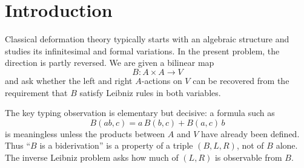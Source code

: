 \documentclass[11pt]{amsart}
\newcommand{\Q}{\mathbb Q}
\begin{document}
\begin{abstract}
Finally, a $v$-degree filtration shows that the stationary $E/K/P$ feedback variables are terminal corrections: they cannot carry information into future distinguished $v^6$ forcing.  The true memory is an autonomous low-rail subsystem $x_b(k)=F_{k+b}^{(k,b)}$, $b=2,3,4,5$, satisfying exact triangular quadratic recursions.  A frozen order-$14$ transfer law passes two genuine out-of-sample tests at arities $22$ and $23$.  More importantly, the homogeneous operator $A=-h\,\mathrm{ad}_\alpha$ and the triangular Cauchy forcing admit an all-orders spectral analysis.  With
\[
E=S+2,
\qquad
q(S)=S^5-4S^4+12S^3-32S^2+80S-192,
\]
the stabilized homogeneous module has minimal polynomial $m_A=Eq$, while the low rails have
\[
p_3=E^2q,
\qquad
p_4=E^3q,
\qquad
p_5=E^4q^2.
\]
Residual modules, finite landing operators, and gcd formulas then give a complete spectral stratification of the $x_5$ extension.  The homogeneous landing, forcing-memory, and canonical higher-lift layers are classified respectively by $\gcd(m_A,r_d)$, $\gcd(p_4,r_d)$, and $\gcd(p_5,r_d)$.  Over a splitting field the finest canonical stratification has $708$ nonzero strata plus the zero datum; over $\Q$ it collapses to eight nonzero strata plus zero.  Gauge quotients, general triangular spectral-extension theorems beyond the fixed cubic contraction, and definitive literature positioning remain open.
\end{abstract}

\maketitle
\tableofcontents

\section{Introduction}

Classical deformation theory typically starts with an algebraic structure and studies its infinitesimal and formal variations.  In the present problem, the direction is partly reversed.  We are given a bilinear map
\[
B:A\times A\longrightarrow V
\]
and ask whether the left and right $A$-actions on $V$ can be recovered from the requirement that $B$ satisfy Leibniz rules in both variables.

The key typing observation is elementary but decisive: a formula such as
\[
B(ab,c)=a\,B(b,c)+B(a,c)\,b
\]
is meaningless unless the products between $A$ and $V$ have already been defined.  Thus ``$B$ is a biderivation'' is a property of a triple $(B,L,R)$, not of $B$ alone.  The inverse Leibniz problem asks how much of $(L,R)$ is observable from $B$.
\end{document}

